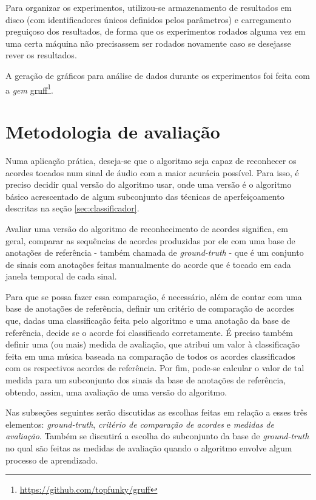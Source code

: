    Para organizar os experimentos, utilizou-se armazenamento de resultados em disco (com identificadores únicos definidos pelos parâmetros) e carregamento preguiçoso dos resultados, de forma que os experimentos rodados alguma vez em uma certa máquina não precisassem ser rodados novamente caso se desejasse rever os resultados.
    
    A geração de gráficos para análise de dados durante os experimentos foi feita com a \textit{gem} \href{https://github.com/topfunky/gruff}{gruff}\footnote{\url{https://github.com/topfunky/gruff}}.

\section{Metodologia de avaliação}

    Numa aplicação prática, deseja-se que o algoritmo seja capaz de reconhecer os acordes tocados num sinal de áudio com a maior acurácia possível. Para isso, é preciso decidir qual versão do algoritmo usar, onde uma versão é o algoritmo básico acrescentado de algum subconjunto das técnicas de aperfeiçoamento descritas na seção \ref{sec:classificador}.
    
    Avaliar uma versão do algoritmo de reconhecimento de acordes significa, em geral, comparar as sequências de acordes produzidas por ele com uma base de anotações de referência - também chamada de \textit{ground-truth} - que é um conjunto de sinais com anotações feitas manualmente do acorde que é tocado em cada janela temporal de cada sinal.
    
    Para que se possa fazer essa comparação, é necessário, além de contar com uma base de anotações de referência, definir um critério de comparação de acordes que, dadas uma classificação feita pelo algoritmo e uma anotação da base de referência, decide se o acorde foi classificado corretamente. É preciso também definir uma (ou mais) medida de avaliação, que atribui um valor à classificação feita em uma música baseada na comparação de todos os acordes classificados com os respectivos acordes de referência. Por fim, pode-se calcular o valor de tal medida para um subconjunto dos sinais da base de anotações de referência, obtendo, assim, uma avaliação de uma versão do algoritmo.

    Nas subseções seguintes serão discutidas as escolhas feitas em relação a esses três elementos: \textit{ground-truth}, \textit{critério de comparação de acordes} e \textit{medidas de avaliação}. Também se discutirá a escolha do subconjunto da base de \textit{ground-truth} no qual são feitas as medidas de avaliação quando o algoritmo envolve algum processo de aprendizado.
    
